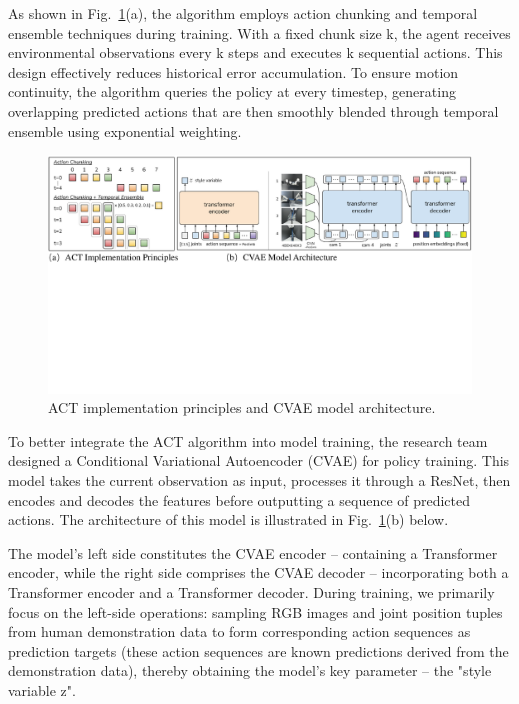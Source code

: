 \documentclass[runningheads]{llncs}
\begin{document}
 As shown in Fig.~\ref{fig1}(a), the algorithm employs action chunking and temporal ensemble techniques during training. With a fixed chunk size k, the agent receives environmental observations every k steps and executes k sequential actions. This design effectively reduces historical error accumulation. To ensure motion continuity, the algorithm queries the policy at every timestep, generating overlapping predicted actions that are then smoothly blended through temporal ensemble using exponential weighting.

\begin{figure}
\includegraphics[width=\textwidth]{fig1.pdf}
\caption{ACT implementation principles and CVAE model architecture.}
\label{fig1}
\end{figure}



To better integrate the ACT algorithm into model training, the research team designed a Conditional Variational Autoencoder (CVAE) for policy training. This model takes the current observation as input, processes it through a ResNet, then encodes and decodes the features before outputting a sequence of predicted actions. The architecture of this model is illustrated in Fig.~\ref{fig1}(b) below.



\noindent The model's left side constitutes the CVAE encoder – containing a Transformer encoder, while the right side comprises the CVAE decoder – incorporating both a Transformer encoder and a Transformer decoder. During training, we primarily focus on the left-side operations: sampling RGB images and joint position tuples from human demonstration data to form corresponding action sequences as prediction targets (these action sequences are known predictions derived from the demonstration data), thereby obtaining the model's key parameter – the "style variable z".
\end{document}
